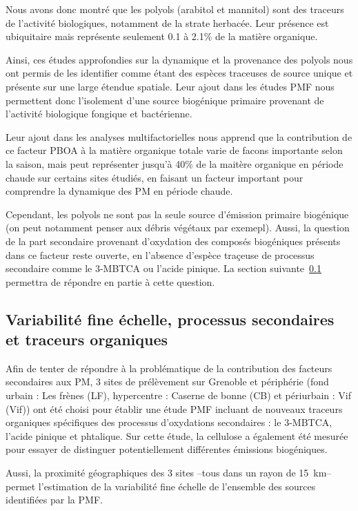 Nous avons donc montré que les polyols (arabitol et mannitol) sont des traceurs de
l'activité biologiques, notamment de la strate herbacée. Leur présence est ubiquitaire
mais représente seulement 0.1 à 2.1\% de la matière organique.

Ainsi, ces études approfondies sur la dynamique et la provenance des polyols nous ont
permis de les identifier comme étant des espèces traceuses de source unique et présente
sur une large étendue spatiale. Leur ajout dans les études PMF nous permettent donc
l'isolement d'une source biogénique primaire provenant de l'activité biologique fongique
et bactérienne.

Leur ajout dans les analyses multifactorielles nous apprend que la contribution de ce
facteur PBOA à la matière organique totale varie de facons importante selon la saison,
mais peut représenter jusqu'à 40\% de la maitère organique en période chaude sur certains
sites étudiés, en faisant un facteur important pour comprendre la dynamique des PM en
période chaude.

Cependant, les polyols ne sont pas la seule source d'émission primaire biogénique (on peut
notamment penser aux débris végétaux par exemepl). Aussi, la question de la part
secondaire provenant d'oxydation des composés biogéniques présents dans ce facteur reste
ouverte, en l'absence d'espèce traçeuse de processus secondaire comme le 3-MBTCA
ou l'acide pinique. La section suivante~\ref{sub:processus_secondaires} permettra de
répondre en partie à cette question.

\subsection{Variabilité fine échelle, processus secondaires et traceurs organiques}%
\label{sub:processus_secondaires}

Afin de tenter de répondre à la problématique de la contribution des facteurs secondaires
aux PM, 3 sites de prélèvement sur Grenoble et périphérie (fond urbain : Les frènes (LF),
hypercentre : Caserne de bonne (CB) et périurbain : Vif (Vif)) ont été choisi pour établir une
étude PMF incluant de nouveaux traceurs organiques spécifiques des processus d'oxydations
secondaires : le 3-MBTCA, l'acide pinique et phtalique. Sur cette étude, la cellulose a
également été mesurée pour essayer de distinguer potentiellement différentes émissions
biogéniques.

Aussi, la proximité géographiques des 3 sites --tous dans un rayon de \SI{15}{\kilo\m}--
permet l'estimation de la variabilité fine échelle de l'ensemble des sources identifiées
par la PMF.

